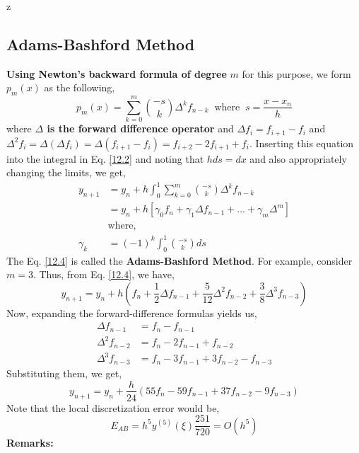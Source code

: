 z\documentclass[a4paper,12pt,twoside]{book}
\newcommand{\nll}[0]{\newline\newline}
\begin{document}
\subsection{Adams-Bashford Method}
\textbf{Using Newton's backward formula of degree }$m$ for this purpose, we form $p_m(x)$ as the following,
\begin{equation}
    p_m(x) 
    = \sum_{k=0}^m \binom{-s}{k} \Delta^k f_{n-k}\;\;\text{where}\;\;s=\frac{x-x_n}{h}
\end{equation}
where \textbf{$\Delta$ is the forward difference operator} and $\Delta f_i = f_{i+1} - f_i$ and $\Delta^2 f_i = \Delta(\Delta f_i) = \Delta(f_{i+1} - f_i) = f_{i+2} - 2f_{i+1} + f_{i} $.
\nll
Inserting this equation into the integral in Eq. \ref{12.2} and noting that $hds = dx$ and also appropriately changing the limits, we get,
\begin{equation}
\label{12.4}
\begin{split}
    y_{n+1} &= y_n + h\int_{0}^1 \sum_{k=0}^m \binom{-s}{k} \Delta^k f_{n-k}\\
    &= y_n + h\left[ \gamma_0  f_n + \gamma_1 \Delta f_{n-1} + \dots + \gamma_m \Delta^m \right]\\
    &\text{where,}\\
    \gamma_k &= (-1)^k \int_0^1 \binom{-s}{k} ds
\end{split}
\end{equation}
The Eq. \ref{12.4} is called the \textbf{Adams-Bashford Method}.
\nll
For example, consider $m=3$. Thus, from Eq. \ref{12.4}, we have,
\[ y_{n+1} = y_n + h\left( f_n + \frac{1}{2}\Delta f_{n-1} + \frac{5}{12} \Delta^2f_{n-2} + \frac{3}{8} \Delta^3 f_{n-3} \right) \]
Now, expanding the forward-difference formulas yields us,
\begin{equation*}
\begin{split}
    \Delta f_{n-1} &= f_n - f_{n-1}\\
    \Delta^2 f_{n-2} &= f_n - 2f_{n-1} + f_{n-2}\\
    \Delta^3 f_{n-3} &= f_n -3f_{n-1} + 3f_{n-2} - f_{n-3}
\end{split}
\end{equation*}
Substituting them, we get,
\[ y_{n+1} = y_n + \frac{h}{24} (55f_n - 59 f_{n-1} + 37 f_{n-2} - 9 f_{n-3}) \]
Note that the local discretization error would be,
\[ E_{AB} = h^5 y^{(5)}(\xi) \frac{251}{720} = O(h^5) \]
\textbf{Remarks:}
\end{document}
